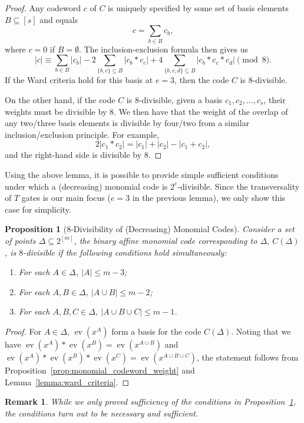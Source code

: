 \documentclass{article}
\newcounter{main}[section]
\newtheorem{proposition}[main]{Proposition}
\newtheorem{remark}[main]{Remark}
\DeclareMathOperator{\ev}{ev}
\begin{document}
\begin{proof}
    Any codeword $c$ of $C$ is uniquely specified by some set of basis elements $B \subseteq [s]$ and equals
    \begin{equation}
        c = \sum_{b \in B} c_b,
    \end{equation}
    where $c = 0$ if $B = \emptyset$.
    The inclusion-exclusion formula then gives us
    \begin{equation}
        |c| \equiv \sum_{b \in B}|c_b| - 2\sum_{\{b,c\} \subseteq B} |c_b*c_c| + 4\sum_{\{b,c,d\} \subseteq B} |c_b*c_c*c_d| \pmod 8.
    \end{equation}
    If the Ward criteria hold for this basis at $e = 3$, then the code $C$ is $8$-divisible. 
    
    On the other hand, if the code $C$ is $8$-divisible, given a basis $c_1, c_2, \ldots, c_s$, their weights must be divisible by $8$. We then have that the weight of the overlap of any two/three basis elements is divisible by four/two from a similar inclusion/exclusion principle. For example,
    \begin{equation}
        2|c_1*c_2| = |c_1| + |c_2| - |c_1+c_2|,
    \end{equation}
    and the right-hand side is divisible by $8$.
\end{proof}

Using the above lemma, it is possible to provide simple sufficient conditions under which a (decreasing) monomial code is $2^e$-divisible. Since the transversality of $T$ gates is our main focus ($e=3$ in the previous lemma), we only show this case for simplicity.

\begin{proposition}[$8$-Divisibility of (Decreasing) Monomial Codes]\label{prop:monomial_divisibility}
    Consider a set of points $\Delta \subseteq 2^{[m]}$, the binary affine monomial code corresponding to $\Delta$, $C(\Delta)$, is $8$-divisible if the following conditions hold simultaneously:
    \begin{enumerate}
        \item For each $A \in \Delta$, $\left|A\right| \leq m-3$;
        \item For each $A,B \in \Delta$, $\left|A\cup B\right| \leq m-2$;
        \item For each $A,B,C \in \Delta$, $\left|A \cup B \cup C\right| \leq m-1$.
    \end{enumerate}
\end{proposition}
\begin{proof}
    For $A \in \Delta$, $\ev(x^A)$ form a basis for the code $C(\Delta)$. Noting that we have $\ev(x^A)*\ev(x^B) = \ev(x^{A\cup B})$ and $\ev(x^A)*\ev(x^B)*\ev(x^C) = \ev(x^{A \cup B \cup C})$, the statement follows from Proposition~\ref{prop:monomial_codeword_weight} and Lemma~\ref{lemma:ward_criteria}.
\end{proof}
\begin{remark}
    While we only proved sufficiency of the conditions in Proposition~\ref{prop:monomial_divisibility}, the conditions turn out to be necessary and sufficient.
\end{remark}
\end{document}
